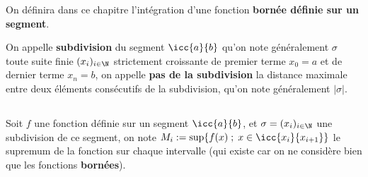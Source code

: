 On définira dans ce chapitre l'intégration d'une fonction \textbf{bornée définie sur un segment}.\<

On appelle \textbf{subdivision} du segment \(\icc{a}{b}\) qu'on note généralement \(\sigma\) toute suite finie \((x_i)_{i \in \N}\) strictement croissante de premier terme \(x_0 = a\) et de dernier terme \(x_n = b\), on appelle \textbf{pas de la subdivision} la distance maximale entre deux éléments consécutifs de la subdivision, qu'on note généralement \(|\sigma|\).

\subsection*{}

Soit \(f\) une fonction définie sur un segment \(\icc{a}{b}\), et \(\sigma = (x_i)_{i \in \N}\) une subdivision de ce segment, on note \(M_i := \sup\{f(x) \; ; \; x \in \icc{x_i}{x_{i+1}}\}\) le supremum de la fonction sur chaque intervalle (qui existe car on ne considère bien que les fonctions \textbf{bornées}).\<

